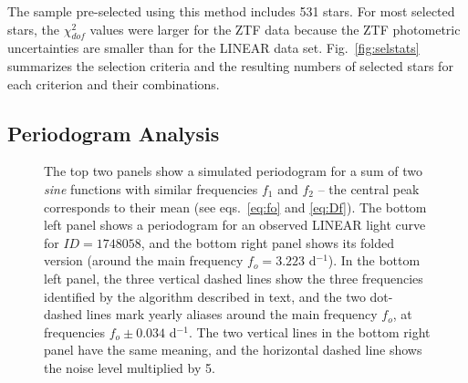 The sample pre-selected using this method includes 531 stars. For most selected stars, the $\chi^2_{dof}$ values were
larger for the ZTF data because the ZTF photometric uncertainties are smaller than for the LINEAR data set. 
Fig.~\ref{fig:selstats} summarizes the selection criteria and the resulting numbers of selected stars for each
criterion and their combinations. 
 


\subsection{Periodogram Analysis} 


\begin{figure}[ht]
  \centering
  \caption{The top two panels show a simulated periodogram for a sum of two {\it sine} functions with similar frequencies
    $f_1$ and  $f_2$ --   the central peak corresponds to their mean (see eqs.~\ref{eq:fo} and \ref{eq:Df}).
    The bottom left panel shows a periodogram for an observed LINEAR light curve for $ID=1748058$, and the bottom right panel shows its
    folded version (around the main frequency $f_o=3.223$ d$^{-1}$). In the bottom left panel, the three vertical dashed
    lines show the three  frequencies identified by the algorithm described in text, and the two dot-dashed lines mark
    yearly aliases around the main frequency $f_o$, at frequencies $f_o \pm 0.034$ d$^{-1}$. The two vertical lines in the
    bottom right panel have the same meaning, and the horizontal dashed line shows the noise level multiplied by 5.}
\label{fig:periodogram}
\end{figure}

